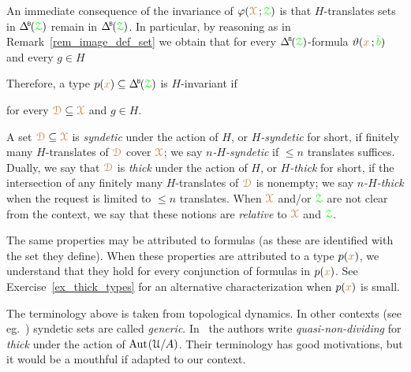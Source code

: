 An immediate consequence of the invariance of $\varphi({\color{brown}\EuScript X}\,;{\color{green}\EuScript Z})$ is that $H$-translates sets in $\BDelta({\grZ})$ remain in $\BDelta({\grZ})$.
In particular, by reasoning as in Remark~\ref{rem_image_def_set} we obtain that for every $\BDelta({\grZ})$-formula $\vartheta({\color{brown} x}\,;{\color{green}\bar b})$ and every $g\in H$


Therefore, a type $p({\mr x})\subseteq\BDelta(\grZ)$ is $H$-invariant if

\hfill for every ${\color{brown}\EuScript D}\subseteq{\color{brown}\EuScript X}$ and $g\in H$.


A set ${\color{brown}\EuScript D}\subseteq{\color{brown}\EuScript X}$ is \emph{syndetic\/} under the action of $H$, or \emph{$H$-syndetic\/} for short, if finitely many $H$-translates of ${\color{brown}\EuScript D}$ cover ${\color{brown}\EuScript X}$; we say \emph{$n$-$H$-syndetic\/} if $\le n$ translates suffices.
Dually, we say that ${\color{brown}\EuScript D}$ is \emph{thick\/} under the action of $H$, or \emph{$H$-thick\/} for short, if the intersection of any finitely many $H$-translates of ${\color{brown}\EuScript D}$ is nonempty; we say \emph{$n$-$H$-thick\/} when the request is limited to $\le n$ translates.
When ${\color{brown}\EuScript X}$ and/or ${\color{green}\EuScript Z}$ are not clear from the context, we say that these notions are \emph{relative\/} to ${\color{brown}\EuScript X}$ and ${\color{green}\EuScript Z}$.

The same properties may be attributed to formulas (as these are identified with the set they define).
When these properties are attributed to a type $p({\color{brown} x})$, we understand that they hold for every conjunction of formulas in $p({\color{brown} x})$.
See Exercise~\ref{ex_thick_types} for an alternative characterization when $p({\color{brown} x})$ is small.

\noindent\llap{\textcolor{red}{\Large\warning}\kern1.5ex}\ignorespaces
The terminology above is taken from topological dynamics.
In other contexts (see eg.~\cite{Newelski09}) syndetic sets are called \textit{generic}.
In~\cite{CK} the authors write \textit{quasi-non-dividing\/} for \textit{thick\/} under the action of ${\rm Aut\kern.15ex}(\EuScript U/A)$.
Their terminology has good motivations, but it would be a mouthful if adapted to our context.

